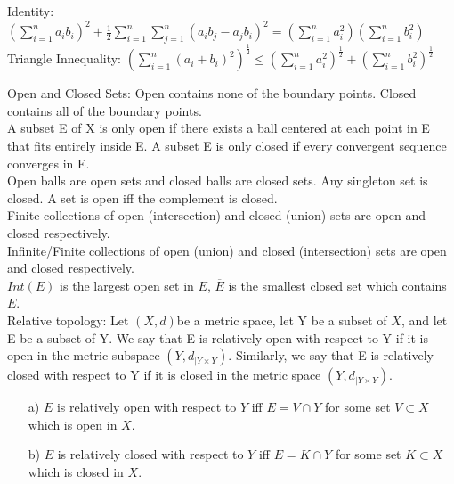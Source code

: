 \documentclass[10pt]{article}
\begin{document}
    \begin{tiny}
    Identity: $(\displaystyle{\sum_{i=1}^{n}}a_ib_i)^2+\frac{1}{2}\displaystyle{\sum_{i=1}^{n}\sum_{j=1}^{n}}(a_ib_j-a_jb_i)^2=(\displaystyle{\sum_{i=1}^{n}}a_{i}^{2})(\displaystyle{\sum_{i=1}^{n}}b_{i}^{2})$\hspace*{1cm}
    Triangle Innequality: $(\displaystyle{\sum_{i=1}^{n}}(a_{i}+b_{i})^2)^\frac{1}{2}\le(\displaystyle{\sum_{i=1}^{n}}a_{i}^{2})^\frac{1}{2}+(\displaystyle{\sum_{i=1}^{n}}b_{i}^{2})^\frac{1}{2}$\\
    \end{tiny}
    \begin{small}
    Open and Closed Sets: Open contains none of the boundary points. Closed contains all of the boundary points.\\
    A subset E of X is only open if there exists a ball centered at each point in E that fits entirely inside E. A subset E is only closed if every convergent sequence converges in E.\\
    Open balls are open sets and closed balls are closed sets. Any singleton set is closed. A set is open iff the complement is closed.\\ 
    Finite collections of open (intersection) and closed (union) sets are open and closed respectively.\\
    Infinite/Finite collections of open (union) and closed (intersection) sets are open and closed respectively.\\
    $Int(E)$ is the largest open set in $E$, $\overline{E}$ is the smallest closed set which contains $E$.\\

    Relative topology: Let $(X,d)$be a metric space, let Y be a subset of $X$, and let E be a subset of Y. 
    We say that E is relatively open with respect to Y if it is open in the metric subspace $(Y, d_{|Y\times Y})$. 
    Similarly, we say that E is relatively closed with respect to Y if it is closed in the metric space $(Y, d_{|Y\times Y})$. 
    
    \begin{itemize}
        \item [a)] $E$ is relatively open with respect to $Y$ iff $E=V\cap Y$ for some set $V\subset X$ which is open in $X$.
        \item [b)] $E$ is relatively closed with respect to $Y$ iff $E=K\cap Y$ for some set $K\subset X$ which is closed in $X$.
    \end{itemize}


\end{small}
\end{document}
